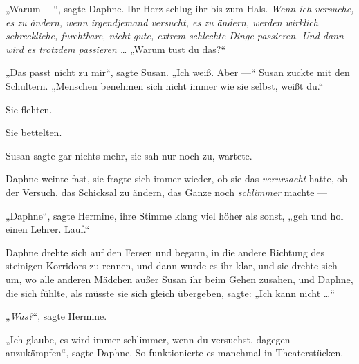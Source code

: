 „Warum —“, sagte Daphne. Ihr Herz schlug ihr bis zum Hals. \emph{Wenn ich versuche, es zu ändern, wenn \emph{irgendjemand} versucht, es zu ändern, werden wirklich schreckliche, furchtbare, nicht gute, extrem schlechte Dinge passieren. Und dann wird es \emph{trotzdem} passieren …}
„Warum tust du das?“

„Das passt nicht zu mir“, sagte Susan.
„Ich weiß. Aber —“ Susan zuckte mit den Schultern.
„Menschen benehmen sich nicht immer wie sie selbst, weißt du.“

Sie flehten.

Sie bettelten.

Susan sagte gar nichts mehr, sie sah nur noch zu, wartete.

Daphne weinte fast, sie fragte sich immer wieder, ob sie das \emph{verursacht} hatte, ob der Versuch, das Schicksal zu ändern, das Ganze noch \emph{schlimmer} machte —

„Daphne“, sagte Hermine, ihre Stimme klang viel höher als sonst, „geh und hol einen Lehrer. Lauf.“

Daphne drehte sich auf den Fersen und begann, in die andere Richtung des steinigen Korridors zu rennen, und dann wurde es ihr klar, und sie drehte sich um, wo alle anderen Mädchen außer Susan ihr beim Gehen zusahen, und Daphne, die sich fühlte, als müsste sie sich gleich übergeben, sagte:
„Ich kann nicht …“

„\emph{Was?}“, sagte Hermine.

„Ich glaube, es wird immer schlimmer, wenn du versuchst, dagegen anzukämpfen“, sagte Daphne. So funktionierte es manchmal in Theaterstücken.

